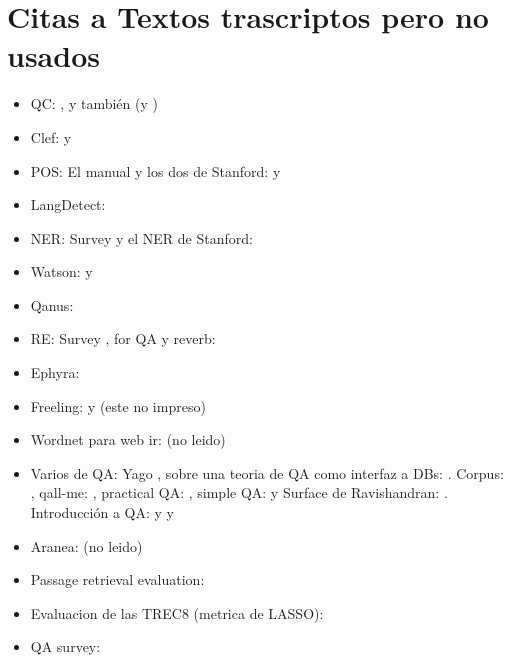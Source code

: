 \section{Citas a Textos trascriptos pero no usados}
\begin{itemize}
\item QC: \cite{QC1}, \cite{QC2} y también \cite{QC3} (y \cite{QC-other})
\item Clef: \cite{GuidelineClef07} y \cite{OverviewClef07} 
\item POS: El manual \cite{POS0} y los dos de Stanford: \cite{POS1} y \cite{POS2}
\item LangDetect: \cite{nakatani2010langdetect}
\item NER: Survey \cite{NER1} y el NER de Stanford: \cite{NER2}
\item Watson: \cite{WATSON1} y \cite{WATSON2}
\item Qanus: \cite{QANUS1}
\item RE: Survey \cite{RE1}, for QA \cite{RE2} y reverb: \cite{RE3}
\item Ephyra: \cite{EPHYRA1}
\item Freeling: \cite{FREELING1} y \cite{FREELING2} (este no impreso)
\item Wordnet para web ir: \cite{WN1} (no leido)
\item Varios de QA: Yago \cite{YAGO-QA1}, sobre una teoria de QA como interfaz a DBs: \cite{QADB1}. Corpus: \cite{TRAIN-QA1}, qall-me: \cite{QALL-ME1}, practical QA: \cite{QAS1}, simple QA: \cite{QAS2} y Surface de Ravishandran: \cite{SURF1}. Introducción a QA: \cite{QA1} y \cite{QA2} y \cite{QA3}
\item Aranea: \cite{ARANEA1} (no leido)
\item Passage retrieval evaluation: \cite{PASSAGE1}
\item Evaluacion de las TREC8 (metrica de \cite{QA3} LASSO): \cite{TREC8}
\item QA survey: \cite{QA-survey}
\end{itemize}
